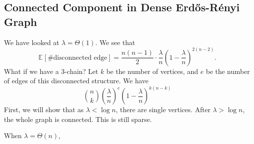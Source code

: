 \subsection{Connected Component in Dense Erdős-Rényi Graph}
We have looked at \(\lambda = \Theta (1)\). We see that
\[
	\mathbb{E}_{}[\text{\# disconnected edge} ]
	= \frac{n(n-1)}{2} \cdot \frac{\lambda}{n} \left( 1 - \frac{\lambda}{n} \right) ^{2 (n-2)}.
\]
What if we have a 3-chain? Let \(k\) be the number of vertices, and \(e\) be the number of edges of this disconnected structure. We have
\[
	\binom{n}{k} \left( \frac{\lambda}{n} \right) ^e \left( 1 - \frac{\lambda}{n} \right) ^{k(n-k)}
\]
First, we will show that as \(\lambda < \log n\), there are single vertices. After \(\lambda > \log n\), the whole graph is connected. This is still sparse.

When \(\lambda = \Theta (n)\),